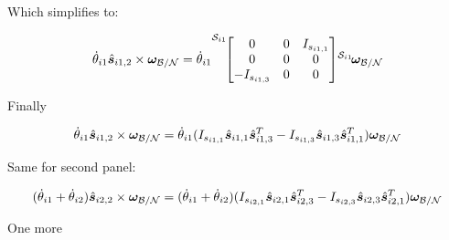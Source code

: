 \documentclass[paper]{aiaaNew}
\begin{document}
Which simplifies to:

\begin{equation}
[I_{\text{sp}_{i1},S_{c,i1}}] \dot{\theta}_{i1} \hat{\bm s}_{i1,2} \times \bm \omega_{\cal{B/N}} = \dot{\theta}_{i1} {\vphantom{\begin{bmatrix}
		I_{s_{i1,1}} & 0 & 0 \\
		0 & I_{s_{i1,2}} & 0 \\
		0 & 0 & I_{s_{i1,3}}
		\end{bmatrix}}}^{\mathcal{S}_{i1}\!}{\begin{bmatrix}
	0 & 0 & I_{s_{i1,1}} \\
	0 & 0 & 0 \\
	-I_{s_{i1,3}} & 0 & 0
	\end{bmatrix}} {\vphantom{\bm \omega_{\cal{B/N}}}}^{\mathcal{S}_{i1}\!}{\bm \omega_{\cal{B/N}}} 
\end{equation}

Finally

\begin{equation}
[I_{\text{sp}_{i1},S_{c,i1}}] \dot{\theta}_{i1} \hat{\bm s}_{i1,2} \times \bm \omega_{\cal{B/N}} = \dot{\theta}_{i1} (I_{s_{i1,1}} \hat{\bm s}_{i1,1} \hat{\bm s}_{i1,3}^T - I_{s_{i1,3}} \hat{\bm s}_{i1,3} \hat{\bm s}_{i1,1}^T) \bm \omega_{\cal{B/N}}
\end{equation}

Same for second panel:

\begin{equation}
[I_{\text{sp}_{i2},S_{c,i2}}] (\dot{\theta}_{i1}  + \dot{\theta}_{i2})  \hat{\bm s}_{i2,2} \times \bm \omega_{\cal{B/N}} = (\dot{\theta}_{i1}  + \dot{\theta}_{i2}) (I_{s_{i2,1}} \hat{\bm s}_{i2,1} \hat{\bm s}_{i2,3}^T - I_{s_{i2,3}} \hat{\bm s}_{i2,3} \hat{\bm s}_{i2,1}^T) \bm \omega_{\cal{B/N}}
\end{equation}

One more
\end{document}
